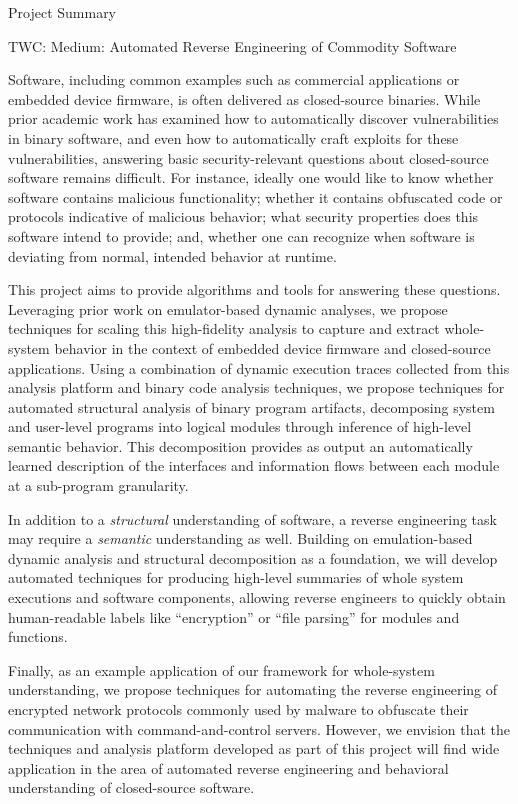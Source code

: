 \documentclass[letterpaper,twoside,11pt,headings=small]{scrartcl}
\newcommand{\basetitle}{TWC: Medium: Automated Reverse Engineering of Commodity Software}
\newcommand{\thetitle}{\basetitle\xspace}
\begin{document}

{\sffamily\bfseries
\begin{center}
\fontsize{16}{16}\selectfont Project Summary

\fontsize{13}{13}\selectfont \thetitle
\end{center}
\label{sec:summary}
}

Software, including common examples such as commercial applications or
embedded device firmware, is often delivered as closed-source binaries.  While
prior academic work has examined how to automatically discover vulnerabilities
in binary software, and even how to automatically craft exploits for these
vulnerabilities, answering basic security-relevant questions about
closed-source software remains difficult.  For instance, ideally one would
like to know whether software contains malicious functionality; whether it
contains obfuscated code or protocols indicative of malicious behavior; what
security properties does this software intend to provide; and, whether one can
recognize when software is deviating from normal, intended behavior at
runtime.

This project aims to provide algorithms and tools for answering these
questions. Leveraging prior work on emulator-based dynamic analyses, we
propose techniques for scaling this high-fidelity analysis to capture and
extract whole-system behavior in the context of embedded device firmware and
closed-source applications.  Using a combination of dynamic execution traces
collected from this analysis platform and binary code analysis techniques, we
propose techniques for automated structural analysis of binary program
artifacts, decomposing system and user-level programs into logical modules
through inference of high-level semantic behavior.  This decomposition
provides as output an automatically learned description of the interfaces and
information flows between each module at a sub-program granularity.

In addition to a \emph{structural} understanding of software, a reverse
engineering task may require a \emph{semantic} understanding as well. Building
on emulation-based dynamic analysis and structural decomposition as a
foundation, we will develop automated techniques for producing high-level
summaries of whole system executions and software components, allowing reverse
engineers to quickly obtain human-readable labels like ``encryption'' or ``file
parsing'' for modules and functions.

Finally, as an example application of our framework for whole-system
understanding, we propose techniques for automating the reverse engineering of
encrypted network protocols commonly used by malware to obfuscate their
communication with command-and-control servers.  However, we envision that the
techniques and analysis platform developed as part of this project will find
wide application in the area of automated reverse engineering and behavioral
understanding of closed-source software.
\end{document}
